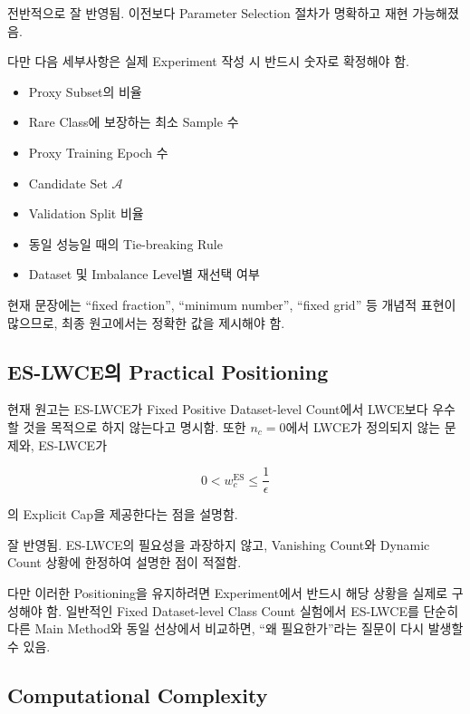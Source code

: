 \documentclass[11pt,a4paper]{article}
\begin{document}
\begin{tcolorbox}[title=반영 평가]
전반적으로 잘 반영됨. 이전보다 Parameter Selection 절차가 명확하고 재현 가능해졌음.
\end{tcolorbox}

다만 다음 세부사항은 실제 Experiment 작성 시 반드시 숫자로 확정해야 함.

\begin{itemize}
\item Proxy Subset의 비율
\item Rare Class에 보장하는 최소 Sample 수
\item Proxy Training Epoch 수
\item Candidate Set \(\mathcal{A}\)
\item Validation Split 비율
\item 동일 성능일 때의 Tie-breaking Rule
\item Dataset 및 Imbalance Level별 재선택 여부
\end{itemize}

현재 문장에는 ``fixed fraction'', ``minimum number'', ``fixed grid'' 등 개념적 표현이 많으므로, 최종 원고에서는 정확한 값을 제시해야 함.

\subsection{ES-LWCE의 Practical Positioning}

현재 원고는 ES-LWCE가 Fixed Positive Dataset-level Count에서 LWCE보다 우수할 것을 목적으로 하지 않는다고 명시함. 또한 \(n_c=0\)에서 LWCE가 정의되지 않는 문제와, ES-LWCE가

\[
0<w_c^{\mathrm{ES}}\leq \frac{1}{\epsilon}
\]

의 Explicit Cap을 제공한다는 점을 설명함.

\begin{tcolorbox}[title=반영 평가]
잘 반영됨. ES-LWCE의 필요성을 과장하지 않고, Vanishing Count와 Dynamic Count 상황에 한정하여 설명한 점이 적절함.
\end{tcolorbox}

다만 이러한 Positioning을 유지하려면 Experiment에서 반드시 해당 상황을 실제로 구성해야 함. 일반적인 Fixed Dataset-level Class Count 실험에서 ES-LWCE를 단순히 다른 Main Method와 동일 선상에서 비교하면, ``왜 필요한가''라는 질문이 다시 발생할 수 있음.

\subsection{Computational Complexity}
\end{document}
